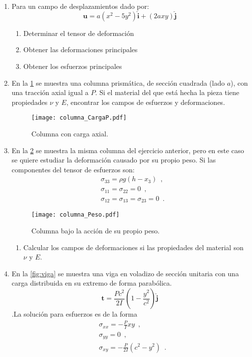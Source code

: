 \documentclass[../notas medios.tex]{subfiles}
\begin{document}
\begin{enumerate}

\item \label{punto01_m} Para un campo de desplazamientos dado por:
\[\mathbf{u} = a(x^2 - 5y^2)\hat{\mathbf{i}} + (2ax y)\hat{\mathbf{j}} \]

\begin{enumerate}
\item Determinar el tensor de deformaci\'on
\item Obtener las deformaciones principales
\item Obtener los esfuerzos principales
\end{enumerate}

\item \label{punto02_m}  En la  \cref{columna_CargaP} se muestra una columna prism\'atica, de secci\'on cuadrada (lado $a$), con una tracci\'on axial igual a $P$. Si el material del que est\'a hecha la pieza tiene propiedades $\nu$ y $E$, encontrar los campos de esfuerzos y deformaciones.
\begin{figure}[H]
	\centering
	\texttt{[image: columna\_CargaP.pdf]} 
	\caption{Columna con carga axial.}
	\label{columna_CargaP}
\end{figure}

\item \label{punto03_m} En la \cref{fig:columna_g} se muestra la misma columna  del ejercicio anterior, pero en este caso se quiere estudiar la deformaci\'on causado por su propio peso. Si las componentes del tensor de esfuerzos son:
\begin{align*}
&\sigma_{33} = \rho g(h- x_{3}) \enspace ,\\
&\sigma_{11} = \sigma_{22} = 0 \enspace ,\\
&\sigma_{12} = \sigma_{13} = \sigma_{23} = 0 \enspace .
\end{align*}

\begin{figure}[h]
	\centering
	\texttt{[image: columna\_Peso.pdf]} 
	\caption{Columna bajo la acci\'on de su propio peso.}
	\label{fig:columna_g}
\end{figure}

\begin{enumerate}
\item Calcular los campos de deformaciones si las propiedades del material son $\nu$ y $E$.
\end{enumerate}
\newpage
\item \label{punto04_m}En la  \cref{fig:viga} se muestra una viga en voladizo de secci\'on unitaria con una carga distribuida en su extremo de forma parab\'olica.
\[\mathbf{t} = \frac{Pc^2}{2I}\left(1-\frac{y^2}{c^2}\right)\hat{\mathbf{j}}\].La soluci\'on para esfuerzos es de la forma
\begin{align*}
&\sigma_{xx} = -\frac{P}{I}xy \enspace ,\\
&\sigma_{yy} = 0 \enspace ,\\
&\sigma_{xy} = -\frac{P}{2I}(c^2 - y^2) \enspace .
\end{align*} \\


\end{enumerate}
\end{document}
